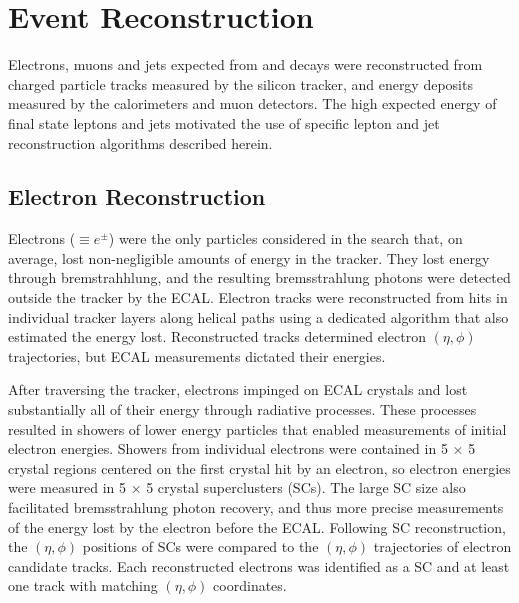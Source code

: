 \chapter{Event Reconstruction}
\label{sec:reco_chapter}

Electrons, muons and jets expected from \WR and \nul decays were reconstructed from charged particle 
tracks measured by the silicon tracker, and energy deposits measured by the calorimeters and muon 
detectors.  The high expected energy of final state leptons and jets motivated the use of specific 
lepton and jet reconstruction algorithms described herein.


\section{Electron Reconstruction}
\label{sec:eleReco}
Electrons ($\equiv e^{\pm}$) were the only particles considered in the \WR search that, on average, lost non-negligible 
amounts of energy in the tracker.  They lost energy through bremstrahhlung, and the resulting bremsstrahlung 
photons were detected outside the tracker by the ECAL.  Electron tracks were reconstructed from hits in 
individual tracker layers along helical paths using a dedicated algorithm that also estimated the energy lost.  
Reconstructed tracks determined electron $(\eta, \phi)$ trajectories, but ECAL measurements dictated their 
energies.

After traversing the tracker, electrons impinged on ECAL crystals and lost substantially all of their 
energy through radiative processes.  These processes resulted in showers of lower energy particles 
that enabled measurements of initial electron energies.  Showers from individual electrons were contained 
in 5 $\times$ 5 crystal regions centered on the first crystal hit by an electron, so electron energies 
were measured in 5 $\times$ 5 crystal superclusters (SCs).  The large SC size also facilitated 
bremsstrahlung photon recovery, and thus more precise measurements of the energy lost by the electron 
before the ECAL.  Following SC reconstruction, the $(\eta, \phi)$ positions of SCs were compared to 
the $(\eta, \phi)$ trajectories of electron candidate tracks.  Each reconstructed electrons was identified 
as a SC and at least one track with matching $(\eta, \phi)$ coordinates.


